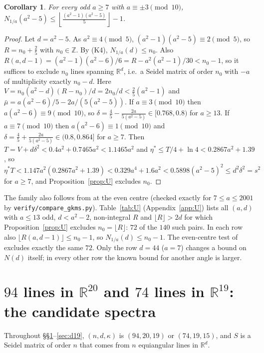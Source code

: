 \documentclass[11pt]{article}
\newtheorem{corollary}[theorem]{Corollary}
\theoremstyle{definition}
\newcommand{\Z}{\mathbb{Z}}
\newcommand{\R}{\mathbb{R}}
\begin{document}
\begin{corollary}\label{cor:family}
For every odd $a\ge7$ with $a\equiv\pm3\pmod{10}$,
$N_{1/a}(a^2-5)\le\left\lfloor\frac{(a^2-1)(a^2-5)}{5}\right\rfloor-1$.
\end{corollary}
\begin{proof}
Let $d=a^2-5$. As $a^2\equiv4\pmod5$, $(a^2-1)(a^2-5)\equiv2\pmod5$, so $R=n_0+\frac25$ with
$n_0\in\Z$. By (K4), $N_{1/a}(d)\le n_0$. Also $R(a,d-1)=(a^2-1)(a^2-6)/6=R-a^2(a^2-1)/30<n_0-1$, so it
suffices to exclude $n_0$ lines spanning $\R^d$, i.e.\ a Seidel matrix of order $n_0$ with $-a$ of
multiplicity exactly $n_0-d$. Here $V=n_0(a^2-d)(R-n_0)/d=2n_0/d<\frac25(a^2-1)$ and
$\bar\mu=a(a^2-6)/5-2a/(5(a^2-5))$. If $a\equiv3\pmod{10}$ then $a(a^2-6)\equiv9\pmod{10}$, so
$\delta=\frac45-\frac{2a}{5(a^2-5)}\in[0.768,0.8)$ for $a\ge13$. If $a\equiv7\pmod{10}$ then
$a(a^2-6)\equiv1\pmod{10}$ and $\delta=\frac45+\frac{2a}{5(a^2-5)}\in(0.8,0.864]$ for $a\ge7$. Then
$T=V+d\delta^2<0.4a^2+0.7465a^2<1.1465a^2$ and $\eta^*\le T/4+\ln4<0.2867a^2+1.39$, so
\[
\eta^*T<1.147a^2(0.2867a^2+1.39)<0.329a^4+1.6a^2<0.5898(a^2-5)^2\le d^2\delta^2=s^2
\]
for $a\ge7$, and Proposition~\ref{prop:U} excludes $n_0$.
\end{proof}

The family also follows from \cite[Thm.~5.21]{GKMS16} at the even centre (checked exactly for
$7\le a\le2001$ by \texttt{verify/compare\_gkms.py}). Table~\ref{tab:U} (Appendix~\ref{app:U}) lists
all $(a,d)$ with $a\le13$ odd, $d<a^2-2$, non-integral $R$ and $\lfloor R\rfloor>2d$ for which
Proposition~\ref{prop:U} excludes $n_0=\lfloor R\rfloor$: $72$ of the $140$ such pairs. In each row also
$\lfloor R(a,d-1)\rfloor\le n_0-1$, so $N_{1/a}(d)\le n_0-1$. The even-centre test of
\cite[Thm.~5.21]{GKMS16} excludes exactly the same $72$. Only the row $d=44$ ($a=7$) changes a bound
on $N(d)$ itself; in every other row the known bound for another angle is larger.

\section{\texorpdfstring{$94$ lines in $\R^{20}$ and $74$ lines in $\R^{19}$: the candidate spectra}{94 lines in R\textasciicircum 20 and 74 lines in R\textasciicircum 19: the candidate spectra}}\label{sec:cand}

Throughout \S\S\ref{sec:cand}--\ref{sec:d19}, $(n,d,\kappa)$ is $(94,20,19)$ or $(74,19,15)$, and $S$ is
a Seidel matrix of order $n$ that comes from $n$ equiangular lines in $\R^d$.
\end{document}
